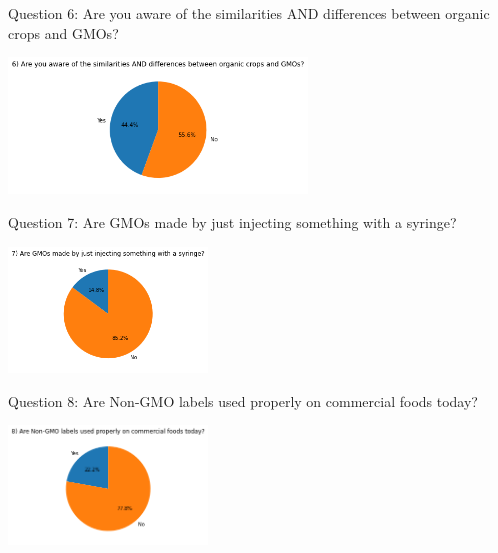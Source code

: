 \documentclass[11pt]{article}
\begin{document}
    \newpage
    Question 6: Are you aware of the similarities AND differences between organic crops and GMOs?
    \begin{center}
        \includegraphics[width=300]{ChanR EDA/q6}
    \end{center}

    Question 7: Are GMOs made by just injecting something with a syringe?
    \begin{center}
        \includegraphics[width=200]{ChanR EDA/q7}
    \end{center}

    \item{Question 8: Are Non-GMO labels used properly on commercial foods today?}
    \begin{center}
        \includegraphics[width=200]{ChanR EDA/q8}
    \end{center}
\end{document}

